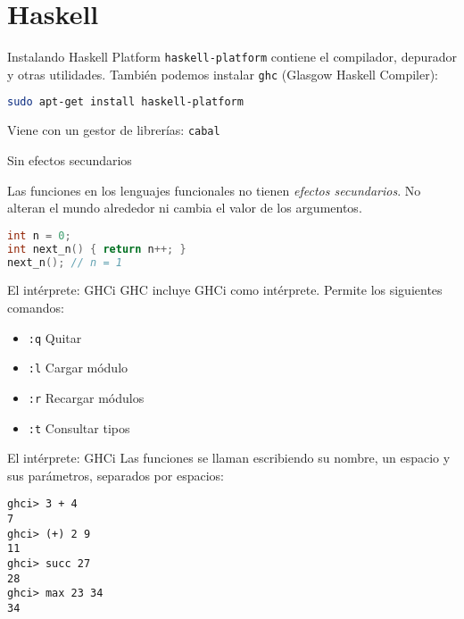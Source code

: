 \section{Haskell}

\begin{frame}[fragile]{Instalando Haskell Platform}
  \texttt{haskell-platform} contiene el compilador, depurador y otras utilidades.
  También podemos instalar \texttt{ghc} (Glasgow Haskell Compiler):
  \espacio
  \begin{lstlisting}[language=bash]
sudo apt-get install haskell-platform
  \end{lstlisting}
  \espacio
  Viene con un gestor de librerías: \texttt{cabal}
\end{frame}

\begin{frame}[fragile]{Sin efectos secundarios}

    Las funciones en los lenguajes funcionales no tienen \textit{efectos secundarios}.
    No alteran el mundo alrededor ni cambia el valor de los argumentos.
    \espacio
  \begin{lstlisting}[language=C++]
int n = 0;
int next_n() { return n++; }
next_n(); // n = 1
  \end{lstlisting}

\end{frame}

\begin{frame}{El intérprete: GHCi}
  GHC incluye GHCi como intérprete. Permite los siguientes comandos:
  \espacio
  \begin{itemize}
    \item \texttt{:q} \qquad  Quitar
    \item \texttt{:l} \qquad  Cargar módulo
    \item \texttt{:r} \qquad  Recargar módulos
    \item \texttt{:t} \qquad  Consultar tipos
  \end{itemize}

\end{frame}

\begin{frame}[fragile]{El intérprete: GHCi}
 Las funciones se llaman escribiendo su nombre, un espacio y sus parámetros, separados por espacios:
\espacio
  \begin{lstlisting}
ghci> 3 + 4
7
ghci> (+) 2 9
11
ghci> succ 27
28
ghci> max 23 34
34
  \end{lstlisting}

\end{frame}
